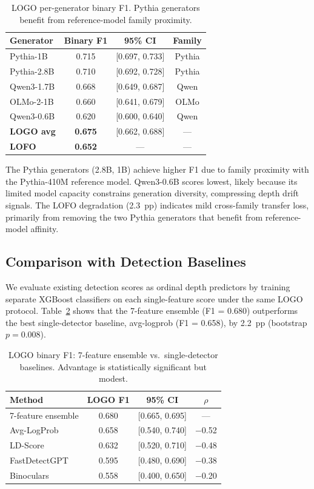 \documentclass[11pt,a4paper]{article}
\begin{document}
\begin{table}[t]
\centering
\small
\caption{LOGO per-generator binary F1. Pythia generators benefit from reference-model family proximity.}
\label{tab:logo}
\begin{tabular}{lccc}
\toprule
\textbf{Generator} & \textbf{Binary F1} & \textbf{95\% CI} & \textbf{Family} \\
\midrule
Pythia-1B & 0.715 & {[0.697, 0.733]} & Pythia \\
Pythia-2.8B & 0.710 & {[0.692, 0.728]} & Pythia \\
Qwen3-1.7B & 0.668 & {[0.649, 0.687]} & Qwen \\
OLMo-2-1B & 0.660 & {[0.641, 0.679]} & OLMo \\
Qwen3-0.6B & 0.620 & {[0.600, 0.640]} & Qwen \\
\midrule
\textbf{LOGO avg} & \textbf{0.675} & {[0.662, 0.688]} & --- \\
\textbf{LOFO} & \textbf{0.652} & --- & --- \\
\bottomrule
\end{tabular}
\end{table}

The Pythia generators (2.8B, 1B) achieve higher F1 due to family proximity with the Pythia-410M reference model.
Qwen3-0.6B scores lowest, likely because its limited model capacity constrains generation diversity, compressing depth drift signals.
The LOFO degradation (2.3~pp) indicates mild cross-family transfer loss, primarily from removing the two Pythia generators that benefit from reference-model affinity.

\subsection{Comparison with Detection Baselines}
\label{sec:baselines}

We evaluate existing detection scores as ordinal depth predictors by training separate XGBoost classifiers on each single-feature score under the same LOGO protocol.
Table~\ref{tab:baselines} shows that the 7-feature ensemble (F1 = 0.680) outperforms the best single-detector baseline, avg-logprob (F1 = 0.658), by 2.2~pp (bootstrap $p = 0.008$).

\begin{table}[t]
\centering
\small
\caption{LOGO binary F1: 7-feature ensemble vs.\ single-detector baselines. Advantage is statistically significant but modest.}
\label{tab:baselines}
\begin{tabular}{lccc}
\toprule
\textbf{Method} & \textbf{LOGO F1} & \textbf{95\% CI} & \textbf{$\rho$} \\
\midrule
7-feature ensemble & 0.680 & {[0.665, 0.695]} & --- \\
Avg-LogProb & 0.658 & {[0.540, 0.740]} & $-$0.52 \\
LD-Score & 0.632 & {[0.520, 0.710]} & $-$0.48 \\
FastDetectGPT & 0.595 & {[0.480, 0.690]} & $-$0.38 \\
Binoculars & 0.558 & {[0.400, 0.650]} & $-$0.20 \\
\bottomrule
\end{tabular}
\end{table}
\end{document}
